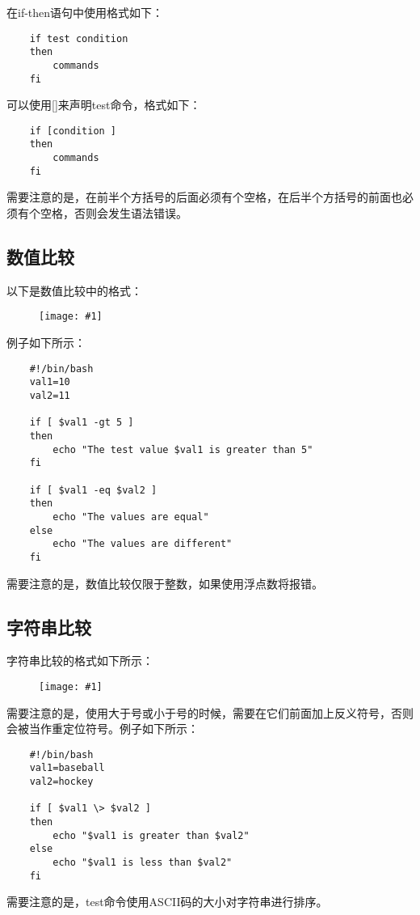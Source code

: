 \documentclass[a4paper,left=2.5cm,right=2.5cm,11pt]{article}
\newcommand{\fic}[1]{\begin{figure}[H]
		\center
		\texttt{[image: \#1]}
	\end{figure}}
\begin{document}
	在if-then语句中使用格式如下：
	\begin{lstlisting}
	if test condition
	then
		commands
	fi
	\end{lstlisting}

	可以使用[]来声明test命令，格式如下：
	\begin{lstlisting}
	if [condition ]
	then
		commands
	fi
	\end{lstlisting}

	需要注意的是，在前半个方括号的后面必须有个空格，在后半个方括号的前面也必须有个空格，否则会发生语法错误。

\subsection{数值比较}
	以下是数值比较中的格式：
	\fic{1.png}

	例子如下所示：
	\begin{lstlisting}
	#!/bin/bash
	val1=10
	val2=11

	if [ $val1 -gt 5 ]
	then
		echo "The test value $val1 is greater than 5"
	fi

	if [ $val1 -eq $val2 ]
	then
		echo "The values are equal"
	else
		echo "The values are different"
	fi
	\end{lstlisting}

	需要注意的是，数值比较仅限于整数，如果使用浮点数将报错。

\subsection{字符串比较}
	字符串比较的格式如下所示：
	\fic{2.png}

	需要注意的是，使用大于号或小于号的时候，需要在它们前面加上反义符号，否则会被当作重定位符号。例子如下所示：
	\begin{lstlisting}
	#!/bin/bash
	val1=baseball
	val2=hockey

	if [ $val1 \> $val2 ]
	then
		echo "$val1 is greater than $val2"
	else
		echo "$val1 is less than $val2"
	fi
	\end{lstlisting}

	需要注意的是，test命令使用ASCII码的大小对字符串进行排序。
\end{document}
